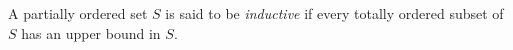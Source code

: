A partially ordered set $S$ is said to be \textit{inductive} if every totally ordered subset of $S$ has an upper bound in $S$.
